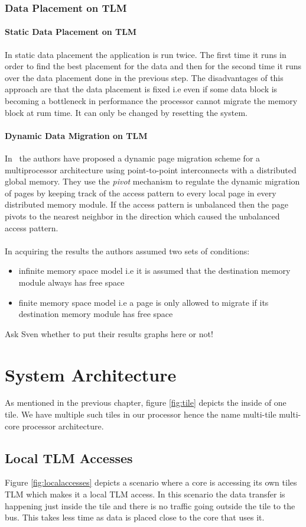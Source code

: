 \documentclass{listhesis}
\begin{document}
\subsection{Data Placement on TLM}
\subsubsection{Static Data Placement on TLM}
In static data placement the application is run twice. The first time it runs in order to find the best placement for the data and then for the second time it runs over the data placement done in the previous step. The disadvantages of this approach are that the data placement is fixed i.e even if some data block is becoming a bottleneck in performance the processor cannot migrate the memory block at rum time. It can only be changed by resetting the system. 
\subsubsection{Dynamic Data Migration on TLM}
In~\cite{dynamicPageMigration} the authors have proposed a dynamic page migration scheme for a multiprocessor architecture using point-to-point interconnects with a distributed global memory. They use the \textit{pivot} mechanism to regulate the dynamic migration of pages by keeping track of the access pattern to every local page in every distributed memory module. If the access pattern is unbalanced then the page pivots to the nearest neighbor in the direction which caused the unbalanced access pattern.\\
\\
In acquiring the results the authors assumed two sets of conditions:
\begin{itemize}
	\item infinite memory space model i.e it is assumed that the destination memory module always has free space
	\item finite memory space model i.e a page is only allowed to migrate if its destination memory module has free space
\end{itemize}
Ask Sven whether to put their results graphs here or not!
\chapter{System Architecture}
As mentioned in the previous chapter, figure \ref{fig:tile} depicts the inside of one tile. We have multiple such tiles in our processor hence the name multi-tile multi-core processor architecture.
\section{Local TLM Accesses}
Figure \ref{fig:localaccesses} depicts a scenario where a core is accessing its own tiles TLM which makes it a local TLM access. In this scenario the data transfer is happening just inside the tile and there is no traffic going outside the tile to the bus. This takes less time as data is placed close to the core that uses it. 
\end{document}
